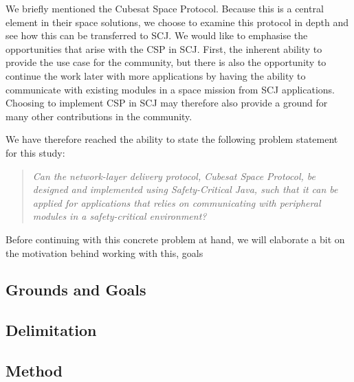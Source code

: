 We briefly mentioned the Cubesat Space Protocol. Because this is a central element in their space solutions, we choose to examine this protocol in depth and see how this can be transferred to SCJ. We would like to emphasise the opportunities that arise with the CSP in SCJ. First, the inherent ability to provide the use case for the community, but there is also the opportunity to continue the work later with more applications by having the ability to communicate with existing modules in a space mission from SCJ applications. Choosing to implement CSP in SCJ may therefore also provide a ground for many other contributions in the community.

We have therefore reached the ability to state the following problem statement for this study:
\begin{quotation}
	\textit{Can the network-layer delivery protocol, Cubesat Space Protocol, be designed and implemented using Safety-Critical Java, such that it can be applied for applications that relies on communicating with peripheral modules in a safety-critical environment?}
\end{quotation}

Before continuing with this concrete problem at hand, we will elaborate a bit on the motivation behind working with this, goals

\subsection{Grounds and Goals} %
\label{sub:grounds_and_goals}

\subsection{Delimitation} %
\label{sub:delimitation}

\subsection{Method} %
\label{sub:method}




